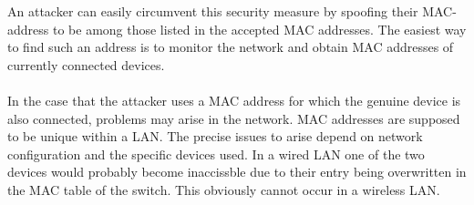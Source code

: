 An attacker can easily circumvent this security measure by spoofing their MAC-address to be among those listed in the accepted MAC addresses. The easiest way to find such an address is to monitor the network and obtain MAC addresses of currently connected devices.  \\ \\In the case that the attacker uses a MAC address for which the genuine device is also connected, problems may arise in the network. MAC addresses are supposed to be unique within a LAN. The precise issues to arise depend on network configuration and the specific devices used. In a wired LAN one of the two devices would probably become inaccissble due to their entry being overwritten in the MAC table of the switch. This obviously cannot occur in a wireless LAN.
